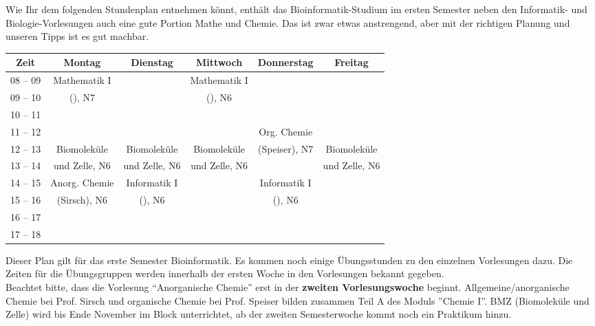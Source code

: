 Wie Ihr dem folgenden Stundenplan entnehmen könnt, enthält das Bioinformatik-Studium im ersten
Semester neben den Informatik- und Biologie-Vorlesungen auch eine gute Portion Mathe und Chemie.
Das ist zwar etwas anstrengend, aber mit der richtigen Planung und unseren Tipps ist es gut
machbar.


\begin{center}
\begin{tabular}{|c|c|c|c|c|c|} \hline
Zeit      & 			Montag 		& Dienstag			& Mittwoch 			& Donnerstag 			& Freitag	 \\
\hline\hline
08 -- 09  & 		Mathematik I 	&  					& Mathematik I 		&  						&			\\
\cline{1-1}\cline{3-3}\cline{5-6}
09 -- 10  & 		(\Matheprof), N7& 					& (\Matheprof), N6  &  						&			\\
\hline
10 -- 11  &							&					&					&						&			\\
\hline
11 -- 12 & 							&  					&					& Org. Chemie 			& 			\\
\cline{1-4}\cline{6-6}
12 -- 13 & 			Biomoleküle		& Biomoleküle   	& Biomoleküle	    & (Speiser), N7			& Biomoleküle \\
\cline{1-1}\cline{5-5}
13 -- 14 & 			und Zelle, N6	& und Zelle, N6		& und Zelle, N6		& 						& und Zelle, N6 \\
\hline
14 -- 15 & 		Anorg. Chemie 		& Informatik I 		& 					& Informatik I 			& 				\\
\cline{1-1}\cline{4-4}\cline{6-6}
15 -- 16 &			 (Sirsch), N6  & (\Infoprof), N6 	& 					& (\Infoprof), N6 		& 				\\
\hline
16 -- 17 & & & & &\\
\hline
17 -- 18 & & & & & \\
\hline
\end{tabular}
\end{center}

Dieser Plan gilt für das erste Semester Bioinformatik. Es kommen noch einige Übungsstunden
zu den einzelnen Vorlesungen dazu. Die Zeiten für die Übungsgruppen werden innerhalb der ersten Woche in den Vorlesungen bekannt gegeben.\\
Beachtet bitte, dass die Vorlesung "`Anorganische Chemie"' erst in der \textbf{zweiten Vorlesungswoche} beginnt.
Allgemeine/anorganische Chemie bei Prof. Sirsch und organische Chemie bei Prof. Speiser bilden zusammen Teil A des Moduls ''Chemie I''.
BMZ (Biomoleküle und Zelle) wird bis Ende November im Block unterrichtet, ab der zweiten Semesterwoche kommt noch ein Praktikum hinzu.

